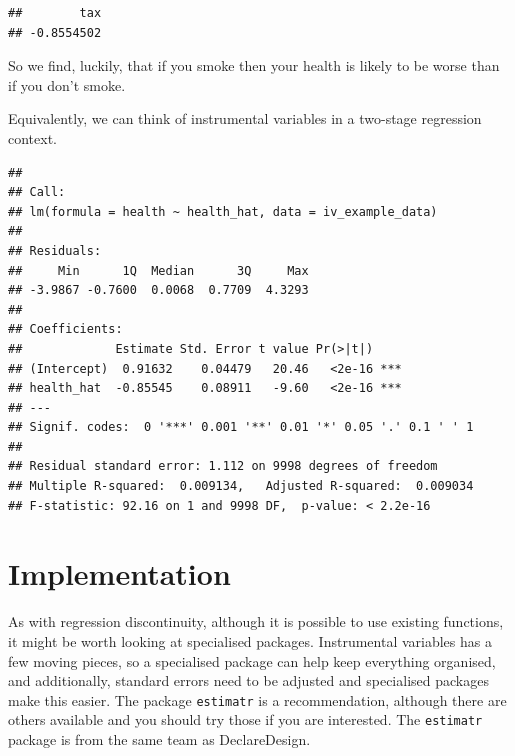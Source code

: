\documentclass[
]{book}
\newenvironment{Shaded}{\begin{snugshade}}{\end{snugshade}}
\newcommand{\DataTypeTok}[1]{\textcolor[rgb]{0.13,0.29,0.53}{#1}}
\newcommand{\KeywordTok}[1]{\textcolor[rgb]{0.13,0.29,0.53}{\textbf{#1}}}
\newcommand{\NormalTok}[1]{#1}
\newcommand{\OperatorTok}[1]{\textcolor[rgb]{0.81,0.36,0.00}{\textbf{#1}}}
\newcommand{\StringTok}[1]{\textcolor[rgb]{0.31,0.60,0.02}{#1}}
\begin{document}
\begin{verbatim}
##        tax 
## -0.8554502
\end{verbatim}

So we find, luckily, that if you smoke then your health is likely to be worse than if you don't smoke.

Equivalently, we can think of instrumental variables in a two-stage regression context.

\begin{Shaded}
\end{Shaded}

\begin{verbatim}
## 
## Call:
## lm(formula = health ~ health_hat, data = iv_example_data)
## 
## Residuals:
##     Min      1Q  Median      3Q     Max 
## -3.9867 -0.7600  0.0068  0.7709  4.3293 
## 
## Coefficients:
##             Estimate Std. Error t value Pr(>|t|)    
## (Intercept)  0.91632    0.04479   20.46   <2e-16 ***
## health_hat  -0.85545    0.08911   -9.60   <2e-16 ***
## ---
## Signif. codes:  0 '***' 0.001 '**' 0.01 '*' 0.05 '.' 0.1 ' ' 1
## 
## Residual standard error: 1.112 on 9998 degrees of freedom
## Multiple R-squared:  0.009134,   Adjusted R-squared:  0.009034 
## F-statistic: 92.16 on 1 and 9998 DF,  p-value: < 2.2e-16
\end{verbatim}

\hypertarget{implementation}{%
\section{Implementation}\label{implementation}}

As with regression discontinuity, although it is possible to use existing functions, it might be worth looking at specialised packages. Instrumental variables has a few moving pieces, so a specialised package can help keep everything organised, and additionally, standard errors need to be adjusted and specialised packages make this easier. The package \texttt{estimatr} is a recommendation, although there are others available and you should try those if you are interested. The \texttt{estimatr} package is from the same team as DeclareDesign.
\end{document}
